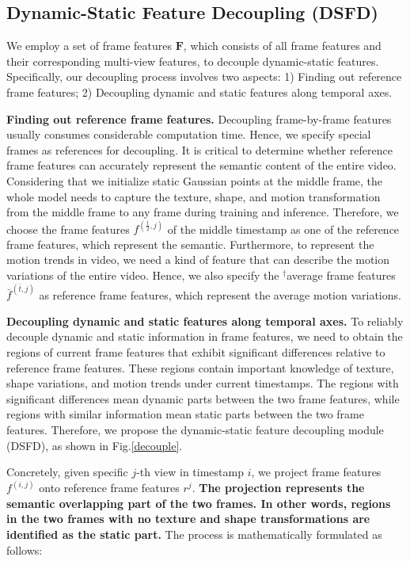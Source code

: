 \subsection{Dynamic-Static Feature Decoupling (DSFD)} \label{dsfd} %
We employ a set of frame features $\textbf{F}$, which consists of all frame features and their corresponding multi-view features, to decouple dynamic-static features. Specifically, our decoupling process involves two aspects: 1) Finding out reference frame features; 2) Decoupling dynamic and static features along temporal axes.

\textbf{Finding out reference frame features.} Decoupling frame-by-frame features usually consumes considerable computation time. Hence, we specify special frames as references for decoupling. It is critical to determine whether reference frame features can accurately represent the semantic content of the entire video. Considering that we initialize static Gaussian points at the middle frame, the whole model needs to capture the texture, shape, and motion transformation from the middle frame to any frame during training and inference. Therefore, we choose the frame features $f^{(\frac{t}{2},j)}$ of the middle timestamp as one of the reference frame features, which represent the semantic. Furthermore, to represent the motion trends in video, we need a kind of feature that can describe the motion variations of the entire video. Hence, we also specify the $^{\dag}$average frame features $\bar{f}^{(\bar{t},j)}$ as reference frame features, which represent the average motion variations.




\textbf{Decoupling dynamic and static features along temporal axes.} To reliably decouple dynamic and static information in frame features, we need to obtain the regions of current frame features that exhibit significant differences relative to reference frame features. These regions contain important knowledge of texture, shape variations, and motion trends under current timestamps. The regions with significant differences mean dynamic parts between the two frame features, while regions with similar information mean static parts between the two frame features. Therefore, we propose the dynamic-static feature decoupling module (DSFD), as shown in Fig.\ref{decouple}.



Concretely, given specific $j$-th view in timestamp $i$, we project frame features $f^{(i,j)}$ onto reference frame features $r^{j}$. \textbf{The projection represents the semantic overlapping part of the two frames. In other words, regions in the two frames with no texture and shape transformations are identified as the static part.} The process is mathematically formulated as follows:

